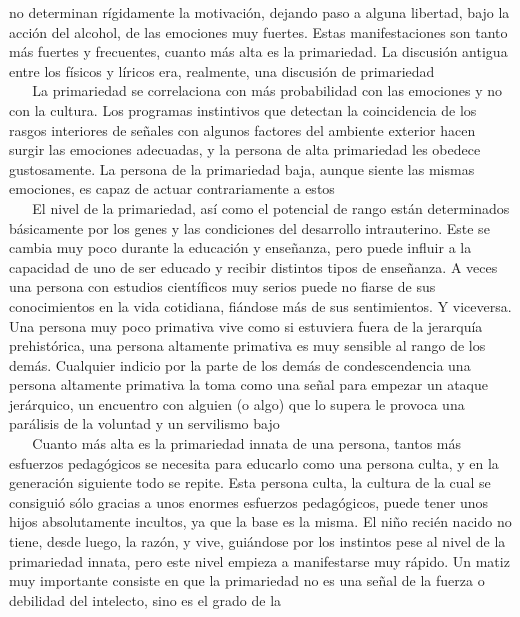 no determinan rígidamente la motivación, dejando paso a alguna libertad,
bajo la acción del alcohol, de las emociones muy fuertes. Estas
manifestaciones son tanto más fuertes y frecuentes, cuanto más alta es
la primariedad. La discusión antigua entre los físicos y líricos era,
realmente, una discusión de primariedad\\
\hspace*{0.333em} ~ ~ La primariedad se correlaciona con más
probabilidad con las emociones y no con la cultura. Los programas
instintivos que detectan la coincidencia de los rasgos interiores de
señales con algunos factores del ambiente exterior hacen surgir las
emociones adecuadas, y la persona de alta primariedad les obedece
gustosamente. La persona de la primariedad baja, aunque siente las
mismas emociones, es capaz de actuar contrariamente a estos\\
\hspace*{0.333em} ~ ~ El nivel de la primariedad, así como el potencial
de rango están determinados básicamente por los genes y las condiciones
del desarrollo intrauterino. Este se cambia muy poco durante la
educación y enseñanza, pero puede influir a la capacidad de uno de ser
educado y recibir distintos tipos de enseñanza. A veces una persona con
estudios científicos muy serios puede no fiarse de sus conocimientos en
la vida cotidiana, fiándose más de sus sentimientos. Y viceversa. Una
persona muy poco primativa vive como si estuviera fuera de la jerarquía
prehistórica, una persona altamente primativa es muy sensible al rango
de los demás. Cualquier indicio por la parte de los demás de
condescendencia una persona altamente primativa la toma como una señal
para empezar un ataque jerárquico, un encuentro con alguien (o algo) que
lo supera le provoca una parálisis de la voluntad y un servilismo bajo\\
\hspace*{0.333em} ~ ~ Cuanto más alta es la primariedad innata de una
persona, tantos más esfuerzos pedagógicos se necesita para educarlo como
una persona culta, y en la generación siguiente todo se repite. Esta
persona culta, la cultura de la cual se consiguió sólo gracias a unos
enormes esfuerzos pedagógicos, puede tener unos hijos absolutamente
incultos, ya que la base es la misma. El niño recién nacido no tiene,
desde luego, la razón, y vive, guiándose por los instintos pese al nivel
de la primariedad innata, pero este nivel empieza a manifestarse muy
rápido. Un matiz muy importante consiste en que la primariedad no es una
señal de la fuerza o debilidad del intelecto, sino es el grado de la
